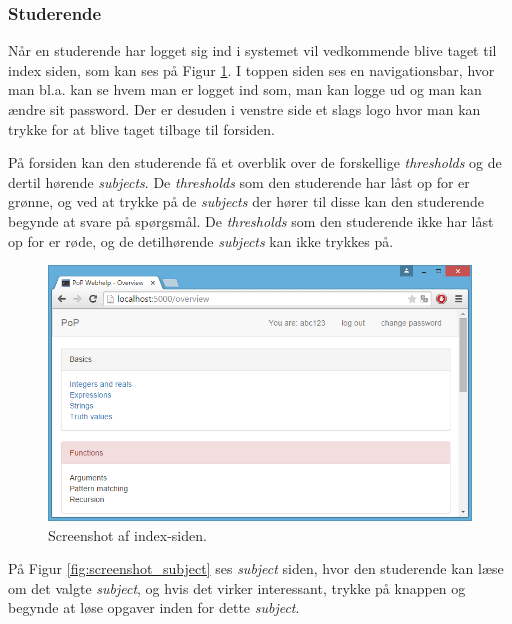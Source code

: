 \documentclass[11pt, a4paper]{article}
\begin{document}
\FloatBarrier

\subsubsection{Studerende}
\label{subsub:screenshots_student}
Når en studerende har logget sig ind i systemet vil vedkommende blive taget til index siden, som kan ses på Figur \ref{fig:screenshot_overview}.  I toppen siden ses en navigationsbar, hvor man bl.a. kan se hvem man er logget ind som, man kan logge ud og man kan ændre sit password. Der er desuden i venstre side et slags logo hvor man kan trykke for at blive taget tilbage til forsiden.

På forsiden kan den studerende få et overblik over de forskellige \emph{thresholds} og de dertil hørende \emph{subjects}. De \emph{thresholds} som den studerende har låst op for er grønne, og ved at trykke på de \emph{subjects} der hører til disse kan den studerende begynde at svare på spørgsmål. De \emph{thresholds} som den studerende ikke har låst op for er røde, og de detilhørende \emph{subjects} kan ikke trykkes på.

\begin{figure}[htpb]
    \centering
    \includegraphics[width=1\linewidth]{figures/interface/overview.png}
    \caption{Screenshot af index-siden.}
    \label{fig:screenshot_overview}
\end{figure}

På Figur \ref{fig:screenshot_subject} ses \emph{subject} siden, hvor den studerende kan læse om det valgte \emph{subject}, og hvis det virker interessant, trykke på knappen og begynde at løse opgaver inden for dette \emph{subject}.
\end{document}
